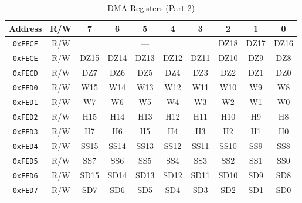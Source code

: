 \begin{table}[ht]
    \begin{center}
        \begin{tabular}{|c|c|c|c|c|c|c|c|c|c|} \hline
            Address & R/W & 7 & 6 & 5 & 4 & 3 & 2 & 1 & 0 \\\hline\hline
            \verb+0xFECF+ & R/W & \multicolumn{5}{|c|}{---} & DZ18 & DZ17 & DZ16 \\ \hline\hline
            \verb+0xFECE+ & R/W & DZ15 & DZ14 & DZ13 & DZ12 & DZ11 & DZ10 & DZ9 & DZ8 \\ \hline
            \verb+0xFECD+ & R/W & DZ7 & DZ6 & DZ5 & DZ4 & DZ3 & DZ2 & DZ1 & DZ0 \\ \hline

            \verb+0xFED0+ & R/W & W15 & W14 & W13 & W12 & W11 & W10 & W9 & W8 \\ \hline
            \verb+0xFED1+ & R/W & W7 & W6 & W5 & W4 & W3 & W2 & W1 & W0 \\ \hline
            \verb+0xFED2+ & R/W & H15 & H14 & H13 & H12 & H11 & H10 & H9 & H8 \\ \hline\hline
            \verb+0xFED3+ & R/W & H7 & H6 & H5 & H4 & H3 & H2 & H1 & H0 \\ \hline

            \verb+0xFED4+ & R/W & SS15 & SS14 & SS13 & SS12 & SS11 & SS10 & SS9 & SS8 \\ \hline
            \verb+0xFED5+ & R/W & SS7 & SS6 & SS5 & SS4 & SS3 & SS2 & SS1 & SS0 \\ \hline

            \verb+0xFED6+ & R/W & SD15 & SD14 & SD13 & SD12 & SD11 & SD10 & SD9 & SD8 \\ \hline
            \verb+0xFED7+ & R/W & SD7 & SD6 & SD5 & SD4 & SD3 & SD2 & SD1 & SD0 \\ \hline
        \end{tabular}
    \end{center}
    \caption{DMA Registers (Part 2)}
    \label{tab:dma_reg_2}
\end{table}


